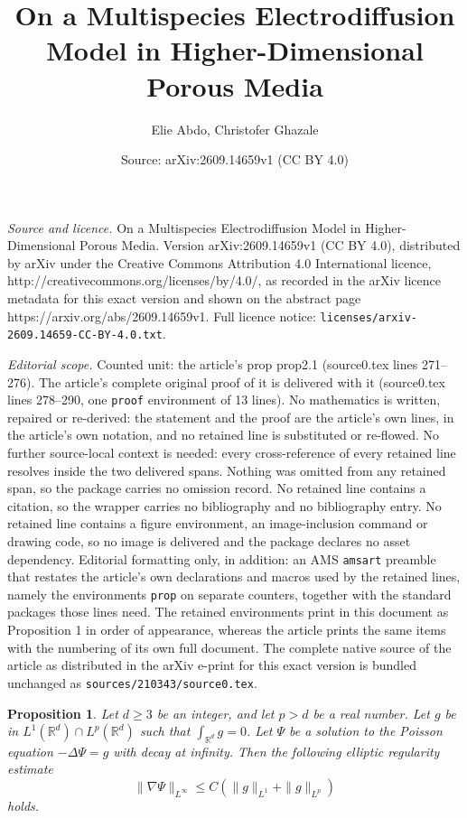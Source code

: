 \documentclass[10pt,a4paper]{amsart}
\title{On a Multispecies Electrodiffusion Model in Higher-Dimensional Porous Media}
\author{Elie Abdo, Christofer Ghazale}
\date{Source: arXiv:2609.14659v1 (CC BY 4.0)}
\newtheorem{prop}{Proposition}
\newcommand{\R}{\mathbb R}
\newcommand{\be}{\begin{equation}}
\newcommand{\ee}{\end{equation}}
\newcommand{\na}{\nabla}
\begin{document}
\maketitle

\noindent\emph{Source and licence.} On a Multispecies Electrodiffusion Model in Higher-Dimensional Porous Media. Version arXiv:2609.14659v1 (CC BY 4.0), distributed by arXiv under the Creative Commons Attribution 4.0 International licence, http://creativecommons.org/licenses/by/4.0/, as recorded in the arXiv licence metadata for this exact version and shown on the abstract page https://arxiv.org/abs/2609.14659v1. Full licence notice: \texttt{licenses/arxiv-2609.14659-CC-BY-4.0.txt}.\par\smallskip

\noindent\textit{Editorial scope.} Counted unit: the article's prop prop2.1 (source0.tex lines 271--276). The article's complete original proof of it is delivered with it (source0.tex lines 278--290, one \texttt{proof} environment of 13 lines). No mathematics is written, repaired or re-derived: the statement and the proof are the article's own lines, in the article's own notation, and no retained line is substituted or re-flowed.  No further source-local context is needed: every cross-reference of every retained line resolves inside the two delivered spans.  Nothing was omitted from any retained span, so the package carries no omission record.  No retained line contains a citation, so the wrapper carries no bibliography and no bibliography entry.  No retained line contains a figure environment, an image-inclusion command or drawing code, so no image is delivered and the package declares no asset dependency.  Editorial formatting only, in addition: an AMS \texttt{amsart} preamble that restates the article's own declarations and macros used by the retained lines, namely the environments \texttt{prop} on separate counters, together with the standard packages those lines need.  The retained environments print in this document as Proposition 1 in order of appearance, whereas the article prints the same items with the numbering of its own full document.  The complete native source of the article as distributed in the arXiv e-print for this exact version is bundled unchanged as \texttt{sources/210343/source0.tex}.
\begin{prop}\label{prop2.1}
    Let $d \ge 3$ be an integer, and let $p > d$ be a real number. Let $g$ be in $L^1(\R^d) \cap L^p(\R^d)$ such that $\int_{\R^d} g = 0$. Let $\Psi$ be a solution to the Poisson equation $- \Delta \Psi = g$  with decay at infinity. Then the following elliptic regularity estimate
    \be
\|\na \Psi\|_{L^{\infty}} \le C\left(\|g\|_{L^1} + \|g\|_{L^p} \right)
    \ee holds.
\end{prop}
\end{document}
